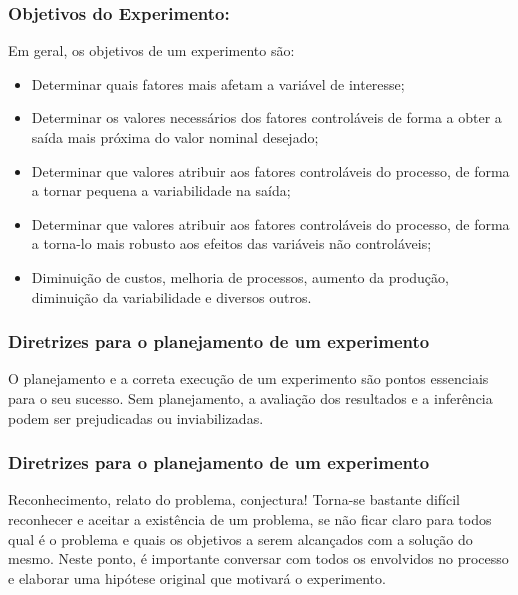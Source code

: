 \documentclass[14pt,aspectratio=1610]{beamer}
\begin{document}
\begin{frame}{}
\frametitle{Objetivos do Experimento:}
\begin{block}{}
Em geral, os objetivos de um experimento são:
\begin{itemize}
    \item Determinar quais fatores mais afetam a variável de interesse;\pause
    \item Determinar os valores necessários dos fatores controláveis de forma a obter a saída mais próxima do valor nominal desejado;\pause
    \item Determinar que valores atribuir aos fatores controláveis do processo, de forma a tornar pequena a variabilidade na saída;\pause
    \item Determinar que valores atribuir aos fatores controláveis do processo, de forma a torna-lo mais robusto aos efeitos das variáveis não controláveis;\pause
    \item Diminuição de custos, melhoria de processos, aumento da produção, diminuição da variabilidade e diversos outros.
\end{itemize}
\end{block}
\end{frame}

\begin{frame}{}
\frametitle{Diretrizes para o planejamento de um experimento}
\begin{block}{}
\justifying
O planejamento e a correta execução de um experimento são pontos essenciais para o seu sucesso. Sem planejamento, a avaliação dos resultados e a inferência podem 
ser prejudicadas ou inviabilizadas. 
\end{block}
\end{frame}

\begin{frame}{}
\frametitle{Diretrizes para o planejamento de um experimento}
\begin{block}{Reconhecimento, relato do problema, conjectura!}
\justifying
Torna-se bastante difícil reconhecer e aceitar a existência de um problema, se não ficar claro para todos qual é o problema e quais os objetivos a serem alcançados com 
a solução do mesmo. Neste ponto, é importante conversar com todos os envolvidos no processo e elaborar uma hipótese original que motivará o experimento.
\end{block}
\end{frame}
\end{document}
